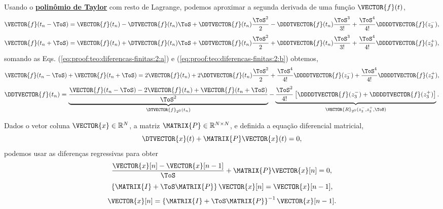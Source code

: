 \begin{myproofT}\label{proof:teo:diferenças-finitas:2}
Usando o \hyperref[prop:polytaylor]{\textbf{polinômio de Taylor}} com resto de Lagrange, podemos aproximar 
a segunda derivada de uma função $\VECTOR{f}(t)$,
\begin{equation}\label{eq:proof:teo:diferencas-finitas:2:a}
\VECTOR{f}(t_n-\ToS) = 
\VECTOR{f}(t_n)-\DTVECTOR{f}(t_n)\ToS +\DDTVECTOR{f}(t_n) \frac{\ToS^2}{2}-\DDDTVECTOR{f}(t_n) \frac{\ToS^3}{3!} +\frac{\ToS^4}{4!}\DDDDTVECTOR{f}(z_{3}^{-}),
\end{equation}
\begin{equation}\label{eq:proof:teo:diferencas-finitas:2:b}
\VECTOR{f}(t_n+\ToS) = 
\VECTOR{f}(t_n)+\DTVECTOR{f}(t_n)\ToS +\DDTVECTOR{f}(t_n) \frac{\ToS^2}{2}+\DDDTVECTOR{f}(t_n) \frac{\ToS^3}{3!} +\frac{\ToS^4}{4!}\DDDDTVECTOR{f}(z_{3}^{+}),
\end{equation}
somando as Eqs. (\ref{eq:proof:teo:diferencas-finitas:2:a}) e (\ref{eq:proof:teo:diferencas-finitas:2:b}) obtemos,
\begin{equation}
\VECTOR{f}(t_n-\ToS) + \VECTOR{f}(t_n+\ToS) = 2 \VECTOR{f}(t_n)+2\DDTVECTOR{f}(t_n) \frac{\ToS^2}{2}+\frac{\ToS^4}{4!}\DDDDTVECTOR{f}(z_{3}^{-}) +\frac{\ToS^4}{4!}\DDDDTVECTOR{f}(z_{3}^{+}),
\end{equation}
\begin{equation}
 \DDTVECTOR{f}(t_n) =
\underbrace{\frac{\VECTOR{f}(t_n-\ToS) -2 \VECTOR{f}(t_n) + \VECTOR{f}(t_n+\ToS)}{\ToS^2}}_{\DTVECTOR{f}_{2^{0}}(t_n)}
-\underbrace{\frac{\ToS^2}{4!}\left[\DDDDTVECTOR{f}(z_{3}^{-}) +\DDDDTVECTOR{f}(z_{3}^{+})\right]}_{\VECTOR{R}_{2^{0}}(z_{3}^{-},z_{3}^{+},\ToS)}.
\end{equation}
\end{myproofT}



\begin{myproofT}\label{proof:theo:differential-eq-discreto:order1:0}
Dados o vetor coluna $\VECTOR{x} \in \mathbb{R}^N$, a matriz $\MATRIX{P} \in \mathbb{R}^{N\times N}$, 
e definida a equação diferencial matricial,
\begin{equation}
\DTVECTOR{x}(t) + \MATRIX{P} \VECTOR{x}(t)=0,
\end{equation}
podemos usar as diferenças regressivas para obter
\begin{equation}
\frac{\VECTOR{x}[n]-\VECTOR{x}[n-1]}{\ToS} + \MATRIX{P} \VECTOR{x}[n]=0,
\end{equation}
\begin{equation}
\left\{\MATRIX{I}  + \ToS \MATRIX{P}\right\} \VECTOR{x}[n]=\VECTOR{x}[n-1],
\end{equation}
\begin{equation}
\VECTOR{x}[n]=\left\{\MATRIX{I}  + \ToS \MATRIX{P}\right\}^{-1}\VECTOR{x}[n-1].
\end{equation}
\end{myproofT}

